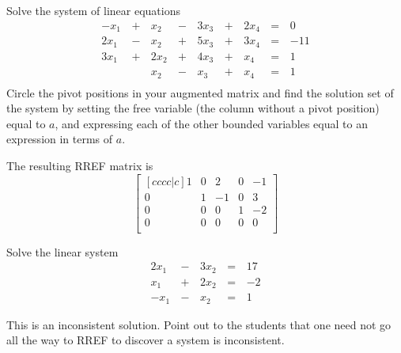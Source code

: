 \begin{applicationActivities}{3}{5}
\begin{activity}{20}
  Solve the system of linear equations 
    \begin{alignat*}{5}
      -x_1 &\,+\,&  x_2 &\,-\,&  3x_3 &\,+\,&  2x_4 &\,=\,& 0 \\
      2x_1 &\,-\,&  x_2 &\,+\,&  5x_3 &\,+\,&  3x_4 &\,=\,& -11 \\
      3x_1 &\,+\,& 2x_2 &\,+\,&  4x_3 &\,+\,&   x_4 &\,=\,& 1 \\
           &\, \,&  x_2 &\,-\,&   x_3 &\,+\,&   x_4 &\,=\,& 1 \\
    \end{alignat*}
  Circle the pivot positions in your augmented matrix and find the solution set of the system
by setting the free variable (the column without a pivot position)
  equal to \(a\), and expressing each of the other
  bounded variables equal to an expression in terms of \(a\).
\end{activity}
\begin{TBLnote}
  The resulting RREF matrix is
  \[
    \begin{bmatrix}[cccc|c]
       1 &  0 &  2 &  0 & -1 \\
       0 &  1 & -1 &  0 &  3 \\
       0 &  0 &  0 &  1 & -2 \\
       0 &  0 &  0 &  0 &  0 \\
    \end{bmatrix}
  \]
\end{TBLnote}


\begin{activity}{10}  Solve the linear system
    \begin{alignat*}{4}
      2x_1 &\,-\,& 3x_2 &\,=\,& 17 \\
       x_1 &\,+\,& 2x_2 &\,=\,& -2 \\
      -x_1 &\,-\,&  x_2 &\,=\,& 1
    \end{alignat*}
\end{activity}
\begin{TBLnote} This is an inconsistent solution.  Point out to the students that one need not go all the way to RREF to discover a system is inconsistent.
\end{TBLnote}


\end{applicationActivities}
